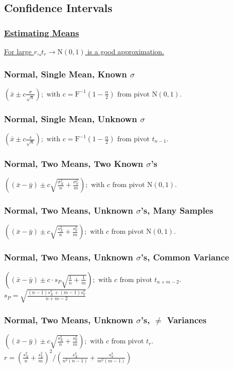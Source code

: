 \documentclass{article}
\begin{document}
\begin{multicols*}{2}
\subsection*{Confidence Intervals}
\subsubsection*{\underline{Estimating Means}}
\underline{For large $r$, $t_{r} \to \mbox{N}(0, 1)$ is a good approximation.}
\subsubsection*{Normal, Single Mean, Known $\sigma$}
$ \left( \bar{x} \pm c \frac{\sigma}{\sqrt{n}} \right) ; \mbox{ with } c=\mbox{F}^{-1}(1-\frac{\alpha}{2}) \mbox{ from pivot } \mbox{N}(0, 1).$
\subsubsection*{Normal, Single Mean, Unknown $\sigma$}
$ \left( \bar{x} \pm c \frac{s}{\sqrt{n}} \right); \mbox{ with } c=\mbox{F}^{-1}(1-\frac{\alpha}{2}) \mbox{ from pivot } t_{n-1}.$
\subsubsection*{Normal, Two Means, Two Known $\sigma$'s}
$ \left( (\bar{x} - \bar{y}) \pm c \sqrt{\frac{\sigma_{X}^{2}}{n} + \frac{\sigma_{Y}^{2}}{m}} \right); \mbox{ with } c \mbox{ from pivot } \mbox{N}(0, 1).$
\subsubsection*{Normal, Two Means, Unknown $\sigma$'s, Many Samples}
$ \left( (\bar{x} - \bar{y}) \pm c \sqrt{\frac{s_{X}^{2}}{n} + \frac{s_{Y}^{2}}{m}} \right); \mbox{ with } c \mbox{ from pivot } \mbox{N}(0, 1).$
\subsubsection*{Normal, Two Means, Unknown $\sigma$'s, Common Variance}
$ \left( (\bar{x} - \bar{y}) \pm c \cdot s_{P} \sqrt{\frac{1}{n} + \frac{1}{m}} \right); \mbox{ with } c \mbox{ from pivot } t_{n+m-2}.$\\
\-\hspace{2cm} $ s_{P} = \sqrt{\frac{(n-1) s^{2}_{X} + (m-1) s^{2}_{Y}}{n+m-2}} $
\subsubsection*{Normal, Two Means, Unknown $\sigma$'s, $\neq$ Variances}
$ \left( (\bar{x} - \bar{y}) \pm c \sqrt{\frac{s_{X}^{2}}{n} + \frac{s_{Y}^{2}}{m}} \right);$ \underline{$\mbox{with } c \mbox{ from pivot } t_{r}.$}\\
\-\hspace{1cm} $ r = \left( \frac{s_{X}^{2}}{n} + \frac{s_{Y}^{2}}{m} \right)^2 / \left( \frac{s_{X}^{4}}{n^{2}(n-1)} + \frac{s_{Y}^{4}}{m^{2}(m-1)} \right) $

\end{multicols*}
\end{document}
